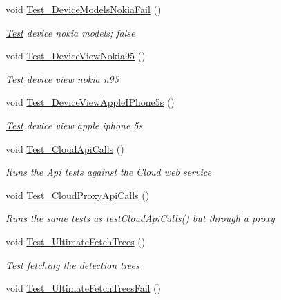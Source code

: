 \begin{DoxyCompactItemize}
void \hyperlink{class_h_d3_1_1_test_1_1_h_d3_test_acb1b39078dc55c7d0f845bfd5fd05767}{Test\+\_\+\+Device\+Models\+Nokia\+Fail} ()
\begin{DoxyCompactList}\small\item\em \hyperlink{namespace_h_d3_1_1_test}{Test} device nokia models; false \end{DoxyCompactList}\item 
void \hyperlink{class_h_d3_1_1_test_1_1_h_d3_test_af83c75a963ca9c63386bd6056072e4f4}{Test\+\_\+\+Device\+View\+Nokia95} ()
\begin{DoxyCompactList}\small\item\em \hyperlink{namespace_h_d3_1_1_test}{Test} device view nokia n95 \end{DoxyCompactList}\item 
void \hyperlink{class_h_d3_1_1_test_1_1_h_d3_test_a0a6aec72c58863377b561115606a270b}{Test\+\_\+\+Device\+View\+Apple\+I\+Phone5s} ()
\begin{DoxyCompactList}\small\item\em \hyperlink{namespace_h_d3_1_1_test}{Test} device view apple iphone 5s \end{DoxyCompactList}\item 
void \hyperlink{class_h_d3_1_1_test_1_1_h_d3_test_a73aca3eabb3d2ae7a0596770af8fc1d3}{Test\+\_\+\+Cloud\+Api\+Calls} ()
\begin{DoxyCompactList}\small\item\em Runs the Api tests against the Cloud web service \end{DoxyCompactList}\item 
void \hyperlink{class_h_d3_1_1_test_1_1_h_d3_test_aadd844c21e793fd76a48404b903634ee}{Test\+\_\+\+Cloud\+Proxy\+Api\+Calls} ()
\begin{DoxyCompactList}\small\item\em Runs the same tests as test\+Cloud\+Api\+Calls() but through a proxy \end{DoxyCompactList}\item 
void \hyperlink{class_h_d3_1_1_test_1_1_h_d3_test_ad6966dd0f5da02360cac44a9fd995a38}{Test\+\_\+\+Ultimate\+Fetch\+Trees} ()
\begin{DoxyCompactList}\small\item\em \hyperlink{namespace_h_d3_1_1_test}{Test} fetching the detection trees \end{DoxyCompactList}\item 
void \hyperlink{class_h_d3_1_1_test_1_1_h_d3_test_a4f1e2702ef9b23564d37d25d83c6dd85}{Test\+\_\+\+Ultimate\+Fetch\+Trees\+Fail} ()

\end{DoxyCompactItemize}
